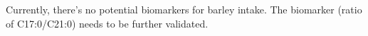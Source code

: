 Currently, there's no potential biomarkers for barley intake. The biomarker (ratio of C17:0/C21:0) needs to be further validated.